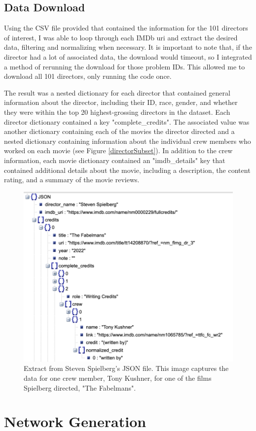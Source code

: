 \documentclass[12pt]{article}
\begin{document}
\subsection*{Data Download}
Using the CSV file provided that contained the information for the 101 directors of interest, I was able to loop through each IMDb uri and extract the desired data, filtering and normalizing when necessary. It is important to note that, if the director had a lot of associated data, the download would timeout, so I integrated a method of rerunning the download for those problem IDs. This allowed me to download all 101 directors, only running the code once. 
\par
The result was a nested dictionary for each director that contained general information about the director, including their ID, race, gender, and whether they were within the top 20 highest-grossing directors in the dataset. Each director dictionary contained a key "complete\_credits". The associated value was another dictionary containing each of the movies the director directed and a nested dictionary containing information about the individual crew members who worked on each movie (see Figure \ref{directorSubset}). In addition to the crew information, each movie dictionary contained an "imdb\_details" key that contained additional details about the movie, including a description, the content rating, and a summary of the movie reviews. 

\begin{figure}
    \centering
    \includegraphics[width=0.5\linewidth]{directorSubset.png}
    \caption{Extract from Steven Spielberg's JSON file. This image captures the data for one crew member, Tony Kushner, for one of the films Spielberg directed, "The Fabelmans".}
    \label{fig:directorSubset}
\end{figure}

\section*{Network Generation}
\end{document}
